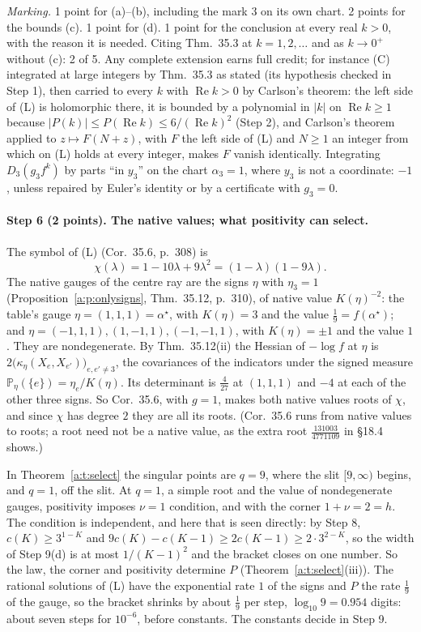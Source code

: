\documentclass[11pt]{article}
\DeclareMathOperator{\re}{Re}
\theoremstyle{plain}
\theoremstyle{definition}
\theoremstyle{remark}
\begin{document}
\smallskip\noindent\emph{Marking.} 1 point for (a)--(b), including the mark $3$ on its own chart. 2 points for the bounds (c). 1 point for (d). 1 point for the conclusion at every real $k>0$, with the reason it is needed. Citing Thm.~35.3 at $k=1,2,\dots$ and as $k\to0^+$ without (c): 2 of 5. Any complete extension earns full credit; for instance (C) integrated at large integers by Thm.~35.3 as stated (its hypothesis checked in Step 1), then carried to every $k$ with $\re k>0$ by Carlson's theorem: the left side of (L) is holomorphic there, it is bounded by a polynomial in $|k|$ on $\re k\ge1$ because $|P(k)|\le P(\re k)\le6/(\re k)^2$ (Step 2), and Carlson's theorem applied to $z\mapsto F(N+z)$, with $F$ the left side of (L) and $N\ge1$ an integer from which on (L) holds at every integer, makes $F$ vanish identically. Integrating $D_3(g_3f^k)$ by parts ``in $y_3$'' on the chart $\alpha_3=1$, where $y_3$ is not a coordinate: $-1$, unless repaired by Euler's identity or by a certificate with $g_3=0$.

\paragraph{Step 6 (2 points). The native values; what positivity can select.}
The symbol of (L) (Cor.~35.6, p.~308) is
\[
\chi(\lambda)=1-10\lambda+9\lambda^2=(1-\lambda)(1-9\lambda).
\]
The native gauges of the centre ray are the signs $\eta$ with $\eta_3=1$ (Proposition~\ref{a:p:onlysigns}, Thm.~35.12, p.~310), of native value $K(\eta)^{-2}$: the table's gauge $\eta=(1,1,1)=\alpha^\star$, with $K(\eta)=3$ and the value $\frac19=f(\alpha^\star)$; and $\eta=(-1,1,1),(1,-1,1),(-1,-1,1)$, with $K(\eta)=\pm1$ and the value $1$. They are nondegenerate. By Thm.~35.12(ii) the Hessian of $-\log f$ at $\eta$ is $2\big(\kappa_\eta(X_e,X_{e'})\big)_{e,e'\neq3}$, the covariances of the indicators under the signed measure $\mathbb P_\eta(\{e\})=\eta_e/K(\eta)$. Its determinant is $\frac4{27}$ at $(1,1,1)$ and $-4$ at each of the other three signs. So Cor.~35.6, with $g=1$, makes both native values roots of $\chi$, and since $\chi$ has degree $2$ they are all its roots. (Cor.~35.6 runs from native values to roots; a root need not be a native value, as the extra root $\frac{131003}{4771109}$ in \S18.4 shows.)

In Theorem~\ref{a:t:select} the singular points are $q=9$, where the slit $[9,\infty)$ begins, and $q=1$, off the slit. At $q=1$, a simple root and the value of nondegenerate gauges, positivity imposes $\nu=1$ condition, and with the corner $1+\nu=2=h$. The condition is independent, and here that is seen directly: by Step 8, $c(K)\ge3^{1-K}$ and $9c(K)-c(K-1)\ge2c(K-1)\ge2\cdot3^{2-K}$, so the width of Step 9(d) is at most $1/(K-1)^2$ and the bracket closes on one number. So the law, the corner and positivity determine $P$ (Theorem~\ref{a:t:select}(iii)). The rational solutions of (L) have the exponential rate $1$ of the signs and $P$ the rate $\frac19$ of the gauge, so the bracket shrinks by about $\frac19$ per step, $\log_{10}9=0.954$ digits: about seven steps for $10^{-6}$, before constants. The constants decide in Step 9.
\end{document}
